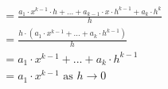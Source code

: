 \documentclass[preview]{standalone}
\begin{document}
\begin{align*}
&= \frac{a_1 \cdot x^{k-1}\cdot h + ... + a_{k-1}\cdot x\cdot h^{k-1} + a_k\cdot h^k}{h}\\ &= \frac{h \cdot (a_1\cdot x^{k-1} + ... + a_k\cdot h^{k-1})}{h}\\ &= a_1\cdot x^{k-1} + ... + a_k\cdot h^{k-1}\\ &= a_1 \cdot x^{k-1} \text{ as } h \rightarrow 0
\end{align*}
\end{document}
